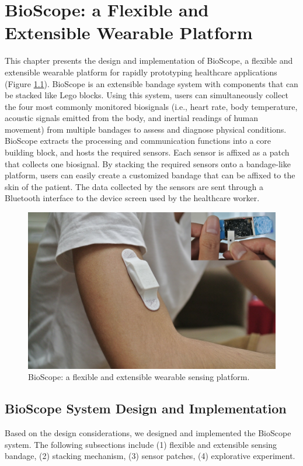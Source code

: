 \chapter{BioScope: a Flexible and Extensible Wearable Platform}
This chapter presents the design and implementation of BioScope, a flexible and extensible wearable platform for rapidly prototyping healthcare applications (Figure \ref{bio_fig0}). BioScope is an extensible bandage system with components that can be stacked like Lego blocks. Using this system, users can simultaneously collect the four most commonly monitored biosignals (i.e., heart rate, body temperature, acoustic signals emitted from the body, and inertial readings of human movement) from multiple bandages to assess and diagnose physical conditions. BioScope extracts the processing and communication functions into a core building block, and hosts the required sensors. Each sensor is affixed as a patch that collects one biosignal. By stacking the required sensors onto a bandage-like platform, users can easily create a customized bandage that can be affixed to the skin of the patient. The data collected by the sensors are sent through a Bluetooth interface to the device screen used by the healthcare worker. 

\begin{figure}[!ht]
\centering
\includegraphics[width=14cm]{image/bio_fig0}
\caption{BioScope: a flexible and extensible wearable sensing platform. }
\label{bio_fig0}
\end{figure}

\section{BioScope System Design and Implementation}
Based on the design considerations, we designed and implemented the BioScope system. The following subsections include (1) flexible and extensible sensing bandage, (2) stacking mechanism, (3) sensor patches, (4) explorative experiment.

